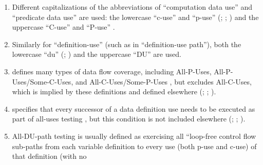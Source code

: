 \begin{enumerate}
    \item %
          Different capitalizations of the abbreviations of ``computation data
          use'' and ``predicate data use'' are used: the lowercase ``c-use''
          and ``p-use'' (\citealp[pp.~3, 27-29, 35-36, 114-155, 117-118, 129]{
              IEEE2021}; \citeyear[p.~124]{IEEE2017};
          \citealp[p.~477, Tab.~12.6]{PetersAndPedrycz2000}) and the uppercase
          ``C-use'' and ``P-use'' \citep[pp.~424-425]{vanVliet2000}.
    \item %
          Similarly for ``definition-use'' (such as in ``definition-use
          path''), both the lowercase ``du'' (\citealp[pp.~3, 27, 29, 35,
              119-121, 129]{IEEE2021}; \citealp[pp.~478-479]{
              PetersAndPedrycz2000}) and the uppercase ``DU''
          \citep[p.~425]{vanVliet2000} are used.
    \item %
           {} defines many types of data flow
          coverage, including All-P-Uses, All-P-Uses/Some-C-Uses, and
          All-C-Uses/Some-P-Uses \citeyearpar[p.~425]{vanVliet2000}, but
          excludes All-C-Uses, which is implied by these definitions and
          defined elsewhere (\citealp[p.~27]{IEEE2021};
          \citeyear[p.~83]{IEEE2017}; \citealp[p.~479]{PetersAndPedrycz2000}).
    \item %
           {} specifies that every successor
          of a data definition use needs to be executed as part of all-uses
          testing \citeyearpar[pp.~424-425]{vanVliet2000}, but this condition
          is not included elsewhere (\citealp[pp.~28-29]{IEEE2021};
          \citeyear[p.~120]{IEEE2017}; \citealp[pp.~478-479]{PetersAndPedrycz2000}).
    \item %
          All-DU-path testing is usually defined as exercising all
          ``loop-free control flow sub-paths from each variable definition to
          every use (both p-use and c-use) of that definition (with no

\end{enumerate}
